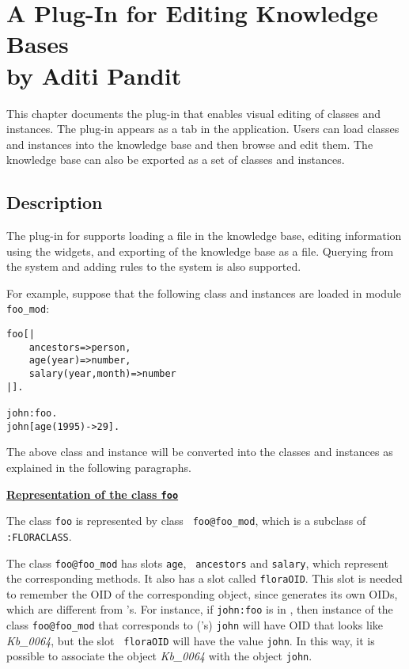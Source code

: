 

\chapter[A \Protege Plug-In for Editing  \FLSYSTEM Knowledge Bases]{A \Protege Plug-In for Editing  \FLSYSTEM Knowledge Bases\\
      {by Aditi Pandit}}

    This chapter documents the \Protege plug-in that enables visual editing of
    \FLSYSTEM classes and instances. The plug-in appears as a tab in the \Protege
    application. Users can load \FLSYSTEM classes and
    instances into the \Protege knowledge base and then browse and edit them.
    The \Protege knowledge base can also be exported as a set of
    \fl classes and instances.

\section{Description}

The \Protege plug-in for \FLSYSTEM supports loading a \FLSYSTEM file in
the \Protege knowledge base, editing information using the \Protege
widgets, and exporting of the \Protege knowledge base as a \FLSYSTEM
file. Querying from the \Protege system and adding rules to the
\FLSYSTEM system is also supported.

For example, suppose that the following \FLSYSTEM class and instances
are loaded in module {\tt foo\_mod}:

\begin{verbatim}
foo[|
    ancestors=>person,
    age(year)=>number,
    salary(year,month)=>number
|].

john:foo.
john[age(1995)->29].
\end{verbatim}

The above \FLSYSTEM class and instance will be converted into the
\Protege classes and instances as explained in the following
paragraphs.

\underline{{\bf Representation of the class {\tt foo}}}

 The \fl class {\tt foo} is represented by \Protege class {\tt
foo@foo\_mod}, which is a subclass of {\tt :FLORACLASS}.

The \Protege class {\tt foo@foo\_mod} has slots {\tt age}, {\tt
  ancestors} and {\tt salary}, which represent the corresponding \fl
methods. It also has a slot called {\tt floraOID}. This slot is
needed to remember the OID of the corresponding \FLSYSTEM object, since
\Protege generates its own OIDs, which are different from \FLSYSTEM's.
For instance, if {\tt john:foo} is in \FLSYSTEM, then \Protege instance
of the \Protege class {\tt foo@foo\_mod} that corresponds to
(\FLSYSTEM's) {\tt john} will have \Protege OID that looks like
\emph{Kb\_0064}, but the slot {\tt
  floraOID} will have the value {\tt john}. In this way, it is possible
to associate the \Protege object \emph{Kb\_0064} with the \FLSYSTEM object
{\tt john}.

